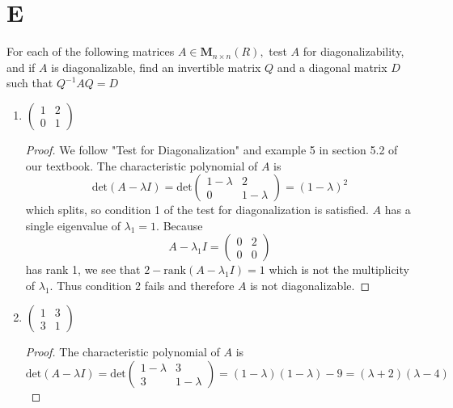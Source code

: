 \documentclass[11pt]{scrartcl}
\begin{document}
\section{E}
For each of the following matrices $A \in \mathbf{M}_{n \times n}(R),$ test $A$ for diagonalizability,
and if $A$ is diagonalizable, find an invertible matrix $Q$ and a diagonal matrix $D$ such that $Q^{-1} A Q=D$
\begin{enumerate}[label=\alph*.]
	\item{
	      $\left(\begin{array}{ll}1 & 2 \\ 0 & 1\end{array}\right)$
	      \begin{proof}
		      We follow "Test for Diagonalization" and example 5 in section 5.2 of our textbook.
		      The characteristic polynomial of $A$ is
		      \[
			      \text{det}(A - \lambda I ) = \text{det}\left(\begin{array}{ll}1 - \lambda & 2 \\ 0 & 1 - \lambda \end{array}\right)
			      = (1 - \lambda)^2
		      \]
		      which splits, so condition 1 of the test for diagonalization is satisfied.
		      $A$ has a single eigenvalue of $\lambda_1 = 1 $. Because
		      \[
			      A - \lambda_1 I = \left(\begin{array}{ll}0 & 2 \\ 0 & 0 \end{array}\right)
		      \]
		      has rank 1, we see that $2 - \text{rank}(A - \lambda_1 I) = 1$ which is not the multiplicity of $\lambda_1$.
		      Thus condition 2 fails and therefore $A$ is not diagonalizable.
	      \end{proof}
	      }
	\item{
	      $\left(\begin{array}{ll}1 & 3 \\ 3 & 1\end{array}\right)$
	      \begin{proof}
		      The characteristic polynomial of $A$ is
		      \[
			      \text{det}(A - \lambda I ) = \text{det}\left(\begin{array}{ll}1 - \lambda & 3 \\ 3 & 1 - \lambda \end{array}\right)
			      = (1 - \lambda)(1 - \lambda) - 9 = (\lambda + 2)(\lambda - 4)
\]
\end{proof}}
\end{enumerate}
\end{document}
